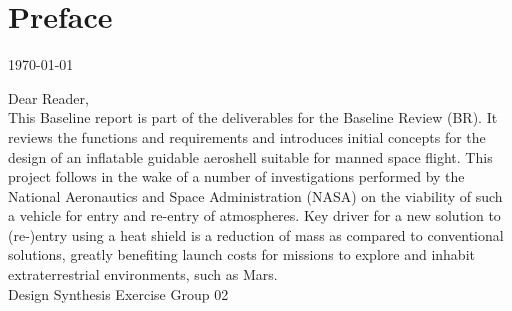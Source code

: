 \section*{Preface}\label{cha:preface}

\begin{flushright}
	\today
\end{flushright}

Dear Reader,	
\\ [1cm]
This Baseline report is part of the deliverables for the Baseline Review (BR). It reviews the functions and requirements and introduces initial concepts for the design of an inflatable guidable aeroshell suitable for manned space flight. This project follows in the wake of a number of investigations performed by the National Aeronautics and Space Administration (NASA) on the viability of such a vehicle for entry and re-entry of atmospheres. Key driver for a new solution to (re-)entry using a heat shield is a reduction of mass as compared to conventional solutions, greatly benefiting launch costs for missions to explore and inhabit extraterrestrial environments, such as Mars. 
\\ [1.5cm]
Design Synthesis Exercise Group 02